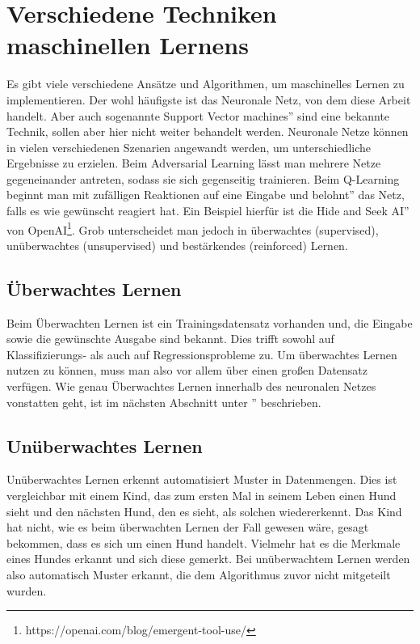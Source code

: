 \documentclass[11pt]{article}
\begin{document}
\section{Verschiedene Techniken maschinellen Lernens}\label{sec:verschiedene-techniken-maschinellen-lernens}
Es gibt viele verschiedene Ansätze und Algorithmen, um maschinelles Lernen zu implementieren. Der wohl häufigste ist das Neuronale Netz, von dem diese Arbeit handelt. Aber auch sogenannte \glqq Support Vector machines'' sind eine bekannte Technik, sollen aber hier nicht weiter behandelt werden. Neuronale Netze können in vielen verschiedenen Szenarien angewandt werden, um unterschiedliche Ergebnisse zu erzielen. Beim Adversarial Learning lässt man mehrere Netze gegeneinander antreten, sodass sie sich gegenseitig trainieren. Beim Q-Learning beginnt man mit zufälligen Reaktionen auf eine Eingabe und \glqq belohnt'' das Netz, falls es wie gewünscht reagiert hat. Ein Beispiel hierfür ist die \glqq Hide and Seek AI'' von OpenAI\footnote{https://openai.com/blog/emergent-tool-use/}. Grob unterscheidet man jedoch in überwachtes (supervised), unüberwachtes (unsupervised) und bestärkendes (reinforced) Lernen.
\subsection{Überwachtes Lernen}
Beim Überwachten Lernen ist ein Trainingsdatensatz vorhanden und, die Eingabe sowie die gewünschte Ausgabe sind bekannt. Dies trifft sowohl auf Klassifizier\-ungs- als auch auf Regressionsprobleme zu. Um überwachtes Lernen nutzen zu können, muss man also vor allem über einen großen Datensatz verfügen. Wie genau Überwachtes Lernen innerhalb des neuronalen Netzes vonstatten geht, ist im nächsten Abschnitt unter \glqq{}'' beschrieben.
\subsection{Unüberwachtes Lernen}
Unüberwachtes Lernen erkennt automatisiert Muster in Datenmengen. Dies ist vergleichbar mit einem Kind, das zum ersten Mal in seinem Leben einen Hund sieht und den nächsten Hund, den es sieht, als solchen wiedererkennt. Das Kind hat nicht, wie es beim überwachten Lernen der Fall gewesen wäre, gesagt bekommen, dass es sich um einen Hund handelt. Vielmehr hat es die Merkmale eines Hundes erkannt und sich diese gemerkt.
Bei unüberwachtem Lernen werden also automatisch Muster erkannt, die dem Algorithmus zuvor nicht mitgeteilt wurden. 
\end{document}
